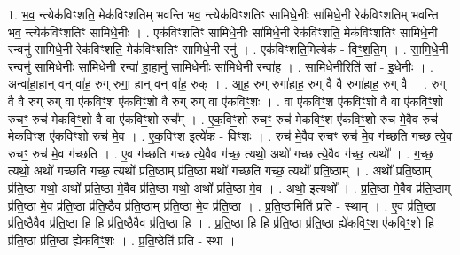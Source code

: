 \documentclass[17pt]{extarticle}
\begin{document}
1. भ॒व॒ न्त्येक॑विꣳशति॒ मेक॑विꣳशतिम् भवन्ति भव॒ न्त्येक॑विꣳशतिꣳ सामिधे॒नीः सा॑मिधे॒नी रेक॑विꣳशतिम् भवन्ति भव॒ न्त्येक॑विꣳशतिꣳ सामिधे॒नीः । . एक॑विꣳशतिꣳ सामिधे॒नीः सा॑मिधे॒नी रेक॑विꣳशति॒ मेक॑विꣳशतिꣳ सामिधे॒नी रन्वनु॑ सामिधे॒नी रेक॑विꣳशति॒ मेक॑विꣳशतिꣳ सामिधे॒नी रनु॑ । . एक॑विꣳशति॒मित्येक॑ - विꣳ॒॒श॒ति॒म् । . सा॒मि॒धे॒नी रन्वनु॑ सामिधे॒नीः सा॑मिधे॒नी रन्वा॑ हा॒हानु॑ सामिधे॒नीः सा॑मिधे॒नी रन्वा॑ह । . सा॒मि॒धे॒नीरिति॑ सां - इ॒धे॒नीः । . अन्वा॑हा॒हान् वन् वा॑ह॒ रुग् रुगा॒ हान् वन् वा॑ह॒ रुक् । . आ॒ह॒ रुग् रुगा॑हाह॒ रुग् वै वै रुगा॑हाह॒ रुग् वै । . रुग् वै वै रुग् रुग् वा ए॑कविꣳ॒॒श ए॑कविꣳ॒॒शो वै रुग् रुग् वा ए॑कविꣳ॒॒शः । . वा ए॑कविꣳ॒॒श ए॑कविꣳ॒॒शो वै वा ए॑कविꣳ॒॒शो रुचꣳ॒॒ रुच॑ मेकविꣳ॒॒शो वै वा ए॑कविꣳ॒॒शो रुच᳚म् । . ए॒क॒विꣳ॒॒शो रुचꣳ॒॒ रुच॑ मेकविꣳ॒॒श ए॑कविꣳ॒॒शो रुच॑ मे॒वैव रुच॑ मेकविꣳ॒॒श ए॑कविꣳ॒॒शो रुच॑ मे॒व । . ए॒क॒विꣳ॒॒श इत्ये॑क - विꣳ॒॒शः । . रुच॑ मे॒वैव रुचꣳ॒॒ रुच॑ मे॒व ग॑च्छति गच्छ त्ये॒व रुचꣳ॒॒ रुच॑ मे॒व ग॑च्छति । . ए॒व ग॑च्छति गच्छ त्ये॒वैव ग॑च्छ॒ त्यथो॒ अथो॑ गच्छ त्ये॒वैव ग॑च्छ॒ त्यथो᳚ । . ग॒च्छ॒ त्यथो॒ अथो॑ गच्छति गच्छ॒ त्यथो᳚ प्रति॒ष्ठाम् प्र॑ति॒ष्ठा मथो॑ गच्छति गच्छ॒ त्यथो᳚ प्रति॒ष्ठाम् । . अथो᳚ प्रति॒ष्ठाम् प्र॑ति॒ष्ठा मथो॒ अथो᳚ प्रति॒ष्ठा मे॒वैव प्र॑ति॒ष्ठा मथो॒ अथो᳚ प्रति॒ष्ठा मे॒व । . अथो॒ इत्यथो᳚ । . प्र॒ति॒ष्ठा मे॒वैव प्र॑ति॒ष्ठाम् प्र॑ति॒ष्ठा मे॒व प्र॑ति॒ष्ठा प्र॑ति॒ष्ठैव प्र॑ति॒ष्ठाम् प्र॑ति॒ष्ठा मे॒व प्र॑ति॒ष्ठा । . प्र॒ति॒ष्ठामिति॑ प्रति - स्थाम् । . ए॒व प्र॑ति॒ष्ठा प्र॑ति॒ष्ठैवैव प्र॑ति॒ष्ठा हि हि प्र॑ति॒ष्ठैवैव प्र॑ति॒ष्ठा हि । . प्र॒ति॒ष्ठा हि हि प्र॑ति॒ष्ठा प्र॑ति॒ष्ठा ह्ये॑कविꣳ॒॒श ए॑कविꣳ॒॒शो हि प्र॑ति॒ष्ठा प्र॑ति॒ष्ठा ह्ये॑कविꣳ॒॒शः । . प्र॒ति॒ष्ठेति॑ प्रति - स्था । \newline
\end{document}
